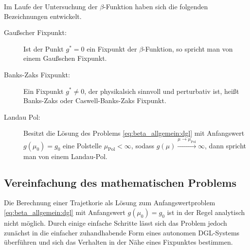   Im Laufe der Untersuchung der $\beta$-Funktion haben sich die folgenden 
  Bezeichnungen entwickelt.
  \begin{description}
   \item[Gaußscher Fixpunkt: ] Ist der Punkt $g^*=0$ ein Fixpunkt der 
      $\beta$-Funktion, so 
      spricht man von einem Gaußschen Fixpunkt.
   \item[Banks-Zaks Fixpunkt: ] Ein Fixpunkt $g^*\neq 0$, der physikalsich 
      sinnvoll und 
      perturbativ ist, heißt Banks-Zaks oder Caswell-Banks-Zaks Fixpunkt.
   \item[Landau Pol: ] Besitzt die Lösung des Problems 
      \eqref{eq:beta_allgemein:dgl} mit 
      Anfangswert $g(\mu_0)=g_0$ eine Polstelle $\mu_\text{Pol}<\infty$, sodass 
      $g(\mu)\overset{\mu\to\mu_\text{Pol}}{\longrightarrow}\infty$, dann 
      spricht man von einem Landau-Pol.
  \end{description}
  
  \subsection{Vereinfachung des mathematischen Problems}
      Die Berechnung einer Trajetkorie als Lösung zum Anfangswertproblem 
      \eqref{eq:beta_allgemein:dgl} mit Anfangswert $g(\mu_0)=g_0$ 
      ist in der Regel analytisch nicht möglich. Durch einige einfache 
      Schritte lässt sich das Problem jedoch zunächst in die einfacher 
      zuhandhabende Form eines autonomen DGL-Systems überführen und sich das 
      Verhalten in der Nähe eines Fixpunktes bestimmen.
      
